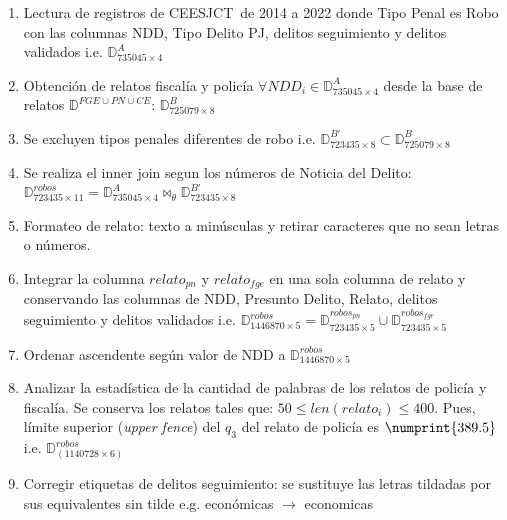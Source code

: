 \documentclass[onecolumn, journal, english, 12pt, a4paper]{IEEEtran} %
\newcommand{\printInicialesComision}{CEESJCT}
\theoremstyle{definition}
\begin{document}
\begin{enumerate}
\item Lectura de registros de \printInicialesComision\, de 2014 a 2022
  donde Tipo Penal es Robo con las columnas NDD, Tipo Delito PJ,
  delitos seguimiento y delitos validados i.e.
  $\mathbb{D}_{735045 \times 4}^A$
        \item Obtención de relatos fiscalía y policía
          $\forall NDD_i \in \mathbb{D}_{735045\times4}^{A}$ desde la
          base de relatos $\mathbb{D}^{FGE\cup PN\cup CE}$:
          $\mathbb{D}_{725079 \times 8}^B$
        \item Se excluyen tipos penales diferentes de robo i.e. $\mathbb{D}_{723435 \times 8}^{B'} \subset \mathbb{D}_{725079 \times 8}^B$
        \item Se realiza el inner join segun los números de Noticia
          del Delito: \\
          $\mathbb{D}^{robos}_{723435\times 11} = \mathbb{D}_{735045
            \times 4}^A \bowtie_\theta \mathbb{D}_{723435 \times
            8}^{B'} $
        \item Formateo de relato: texto a minúsculas y retirar
          caracteres que no sean letras o números.
        \item Integrar la columna $relato_{pn}$ y $relato_{fge}$ en
          una sola columna de relato y conservando las columnas de
          NDD, Presunto Delito, Relato, delitos seguimiento y delitos
          validados i.e.
          $\mathbb{D}^{robos}_{1446870 \times 5} =
          \mathbb{D}^{robos_{pn}}_{723435\times 5} \cup
          \mathbb{D}^{robos_{fge}}_{723435\times 5}$
        \item Ordenar ascendente según valor de NDD a $\mathbb{D}^{robos}_{1446870 \times 5}$
        \item Analizar la estadística de la cantidad de palabras de
          los relatos de policía y fiscalía. Se conserva los relatos
          tales que: $50 \leq len(relato_i) \leq 400$. Pues, límite
          superior (\emph{upper fence}) del $q_3$ del relato de
          policía es $\numprint{389.5}$
          i.e. $\mathbb{D}^{robos}_{(1140728 \times 6)}$
        \item Corregir etiquetas de delitos seguimiento: se sustituye
          las letras tildadas por sus equivalentes sin tilde
          e.g. económicas $\rightarrow$ economicas

\end{enumerate}
\end{document}
